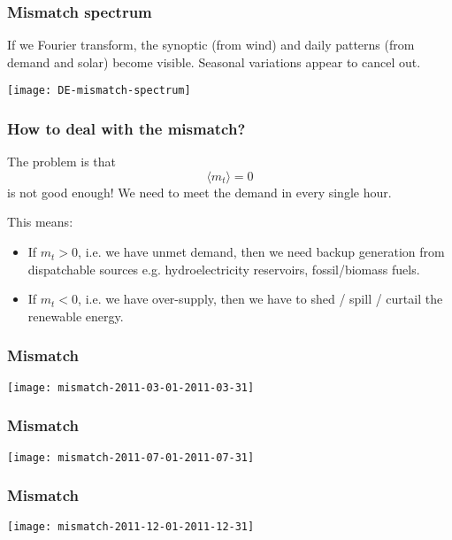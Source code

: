 \documentclass[10pt,aspectratio=169,dvipsnames]{beamer}
\let\olditem\item
\renewcommand{\item}{%
\olditem\vspace{5pt}}
\begin{document}
\begin{frame}
  \frametitle{Mismatch spectrum}

  If we Fourier transform, the synoptic (from wind) and daily patterns (from demand and solar) become visible. Seasonal variations appear to cancel out.

  \centering
  \texttt{[image: DE-mismatch-spectrum]}

\end{frame}



\begin{frame}
  \frametitle{How to deal with the mismatch?}

  The problem is that
    \begin{equation*}
    \langle m_t \rangle = 0
  \end{equation*}
    is not good enough! We need to meet the demand in every single hour.

    This means:
    \begin{itemize}
      \item If $m_t > 0$, i.e. we have unmet demand, then we need
        backup generation from \alert{dispatchable} sources
        e.g. hydroelectricity reservoirs, fossil/biomass fuels.
      \item If $m_t < 0$, i.e. we have over-supply, then we have to
        shed / spill / \alert{curtail} the renewable energy.
    \end{itemize}


\end{frame}


\begin{frame}
  \frametitle{Mismatch}


  \centering
  \texttt{[image: mismatch-2011-03-01-2011-03-31]}


\end{frame}

\begin{frame}
  \frametitle{Mismatch}


  \centering
  \texttt{[image: mismatch-2011-07-01-2011-07-31]}


\end{frame}

\begin{frame}
  \frametitle{Mismatch}


  \centering
  \texttt{[image: mismatch-2011-12-01-2011-12-31]}


\end{frame}
\end{document}
